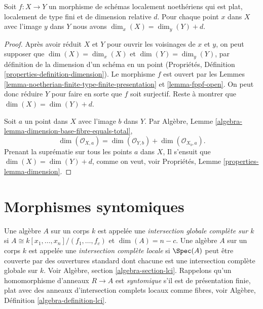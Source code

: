\begin{lemma}
\label{lemma-rel-dimension-dimension}
Soit $f : X \to Y$ un morphisme de schémas localement noethériens qui est plat,
localement de type fini et de dimension relative $d$. Pour chaque
point $x$ dans $X$ avec l'image
$y$ dans $Y$ nous avons $\dim_x(X) = \dim_y(Y) + d$.
\end{lemma}

\begin{proof}
Après avoir réduit $X$ et $Y$ pour ouvrir les
voisinages de $x$ et $y$, on peut supposer que
$\dim(X) = \dim_x(X)$ et $\dim(Y) = \dim_y(Y)$, par définition de la dimension
d'un schéma en un point (Propriétés, Définition
\ref{properties-definition-dimension}). Le morphisme $f$
est ouvert par les Lemmes \ref{lemma-noetherian-finite-type-finite-presentation} et \ref{lemma-fppf-open}.
On peut donc réduire
$Y$ pour faire en sorte que $f$ soit
surjectif. Reste à montrer que $\dim(X) = \dim(Y) + d$.

\medskip\noindent
Soit $a$ un point dans $X$ avec l'image
$b$ dans $Y$. Par Algèbre, Lemme \ref{algebra-lemma-dimension-base-fibre-equals-total},
$$
\dim(\mathcal{O}_{X,a}) = \dim(\mathcal{O}_{Y,b}) + \dim(\mathcal{O}_{X_b, a}).
$$
Prenant la suprématie sur tous les points $a$ dans
$X$, Il s'ensuit que $\dim(X) = \dim(Y) + d$, comme
on veut, voir Propriétés, Lemme \ref{properties-lemma-dimension}.
\end{proof}











\section{Morphismes syntomiques}
\label{section-syntomic}

\noindent
Une algèbre $A$ sur un corps $k$ est appelée
une {\it intersection globale
complète sur $k$} si $A \cong k[x_1, \ldots, x_n]/(f_1, \ldots, f_c)$ et $\dim(A) = n - c$.
Une algèbre $A$ sur un corps $k$ est appelée une {\it
intersection complète locale} si $\Spec(A)$
peut être couverte par des ouvertures standard dont chacune est
une intersection complète globale sur $k$. Voir Algèbre,
section \ref{algebra-section-lci}. Rappelons qu'un homomorphisme d'anneaux $R \to A$
est {\it syntomique} s'il est
de présentation finie, plat avec des anneaux d'intersection complets
locaux comme fibres, voir Algèbre, Définition \ref{algebra-definition-lci}.

